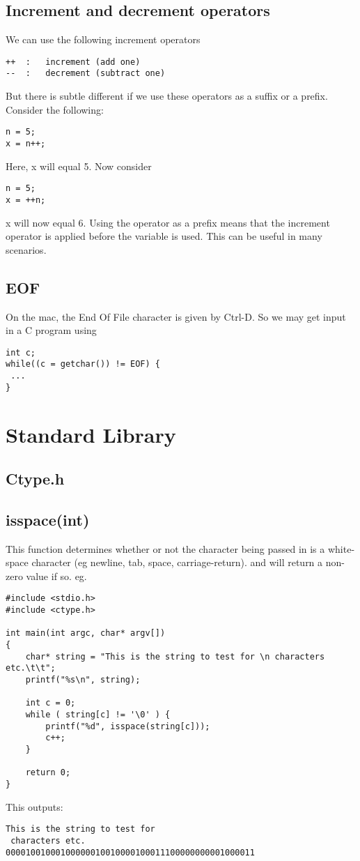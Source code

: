 \subsection{Increment and decrement operators}

We can use the following increment operators
\begin{verbatim}
++ 	: 	increment (add one)
--	: 	decrement (subtract one)
\end{verbatim}
But there is subtle different if we use these operators as a suffix or a prefix. Consider the following:
\begin{verbatim}
n = 5;
x = n++;
\end{verbatim}
Here, x will equal 5. Now consider
\begin{verbatim}
n = 5;
x = ++n;
\end{verbatim}
x will now equal 6. Using the operator as a prefix means that the increment operator is applied before the variable is used. This can be useful in many scenarios.

\subsection{EOF}

On the mac, the End Of File character is given by Ctrl-D. So we may get input in a C program using 
\begin{verbatim}
int c;
while((c = getchar()) != EOF) {
 ...
}
\end{verbatim}

\section{Standard Library}

\subsection{Ctype.h}

\subsection{isspace(int)}

This function determines whether or not the character being passed in is a white-space character (eg newline, tab, space, carriage-return). and will return a non-zero value if so. eg.
\begin{verbatim}
#include <stdio.h>
#include <ctype.h>

int main(int argc, char* argv[])
{ 
    char* string = "This is the string to test for \n characters etc.\t\t";
    printf("%s\n", string);

    int c = 0;
    while ( string[c] != '\0' ) { 
        printf("%d", isspace(string[c]));
        c++;
    }   

    return 0;
}
\end{verbatim}
This outputs:
\begin{verbatim}
This is the string to test for 
 characters etc.		
00001001000100000010010000100011100000000001000011
\end{verbatim}



